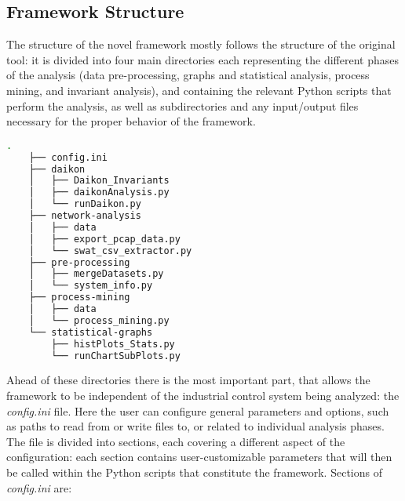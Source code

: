 \subsection{Framework Structure}
\label{subsec:4_framework_struct}
The structure of the novel framework mostly follows the structure of the original tool: it is divided into four main directories each representing the different phases of the analysis (data pre-processing, graphs and statistical analysis, process mining, and invariant analysis), and containing the relevant Python scripts that perform the analysis, as well as subdirectories and any input/output files necessary for the proper behavior of the framework.

\begin{lstlisting}[language=bash, numbers=none, caption=Novel Framework structure and Python scripts, label=lst:4_tree_command]
	.
	├── config.ini
	├── daikon
	│   ├── Daikon_Invariants
	│   ├── daikonAnalysis.py
	│   └── runDaikon.py
	├── network-analysis
	│   ├── data
	│   ├── export_pcap_data.py
	│   └── swat_csv_extractor.py
	├── pre-processing
	│   ├── mergeDatasets.py
	│   └── system_info.py
	├── process-mining
	│   ├── data
	│   └── process_mining.py
	└── statistical-graphs
	    ├── histPlots_Stats.py
	    └── runChartSubPlots.py
\end{lstlisting}
\vfill

Ahead of these directories there is the most important part, that allows the framework to be independent of the industrial control system being analyzed: the \textit{config.ini} file. Here the user can configure general parameters and options, such as paths to read from or write files to, or related to individual analysis phases.\newline
The file is divided into sections, each covering a different aspect of 
the configuration: each section contains user-customizable parameters 
that will then be called within the Python scripts that constitute the framework. Sections of \textit{config.ini} are:

